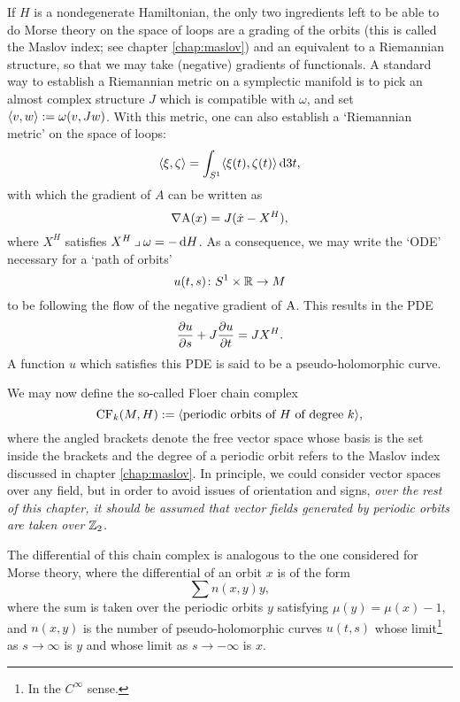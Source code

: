 If $H$ is a nondegenerate Hamiltonian, the only two ingredients left to be able to do Morse theory on the space of loops are a grading of the orbits (this is called the Maslov index; see chapter \ref{chap:maslov}) and an equivalent to a Riemannian structure, so that we may take (negative) gradients of functionals. A standard way to establish a Riemannian metric on a symplectic manifold is to pick an almost complex structure $J$ which is compatible with $\omega$, and set $\braket{v,w} := \omega(v, Jw)$. With this metric, one can also establish a `Riemannian metric' on the space of loops:
\begin{equation}
\braket{\xi, \zeta} = \int_{S^1} \braket{\xi(t), \zeta(t)} \dl3t,
\end{equation}
with which the gradient of $A$ can be written as
\begin{equation}
\grad \AA(x) = J(\dot x - X^H),
\end{equation}
where $X^H$ satisfies $X^H \into \omega = - \dl H$. As a consequence, we may write the `ODE' necessary for a `path of orbits'
\begin{equation}
u(t,s) \colon S^1 \times \R \to M
\end{equation}
to be following the flow of the negative gradient of $\AA$. This results in the PDE
\begin{equation}
\diffp u s + J \diffp u t = J X^H.
\end{equation}
A function $u$ which satisfies this PDE is said to be a pseudo-holomorphic curve.

We may now define the so-called Floer chain complex
\begin{equation}
\CF_k(M, H) := \braket{\text{periodic orbits of $H$ of degree $k$}},
\end{equation}
where the angled brackets denote the free vector space whose basis is the set inside the brackets and the degree of a periodic orbit refers to the Maslov index discussed in chapter \ref{chap:maslov}. In principle, we could consider vector spaces over any field, but in order to avoid issues of orientation and signs, \emph{over the rest of this chapter, it should be assumed that vector fields generated by periodic orbits are taken over $\Z_2$}.

The differential of this chain complex is analogous to the one considered for Morse theory, where the differential of an orbit $x$ is of the form
\begin{equation}
\sum n(x,y) y,
\end{equation}
where the sum is taken over the periodic orbits $y$ satisfying $\mu(y) = \mu(x) - 1$, and $n(x,y)$ is the number of pseudo-holomorphic curves $u(t,s)$ whose limit\footnote{In the $C^\infty$ sense.} as $s \to \infty$ is $y$ and whose limit as $s \to -\infty$ is $x$.

